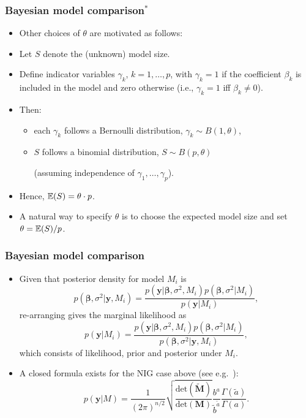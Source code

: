 \documentclass[xcolor=table,10pt]{beamer}
\begin{document}
\begin{frame}
  \frametitle{Bayesian model comparison$^\ast$}
  \begin{itemize}
  \item Other choices of $\theta$ are motivated as follows:
  \item Let $S$ denote the (unknown) model size.
  \item Define indicator variables $\gamma_k$, $k=1,\ldots, p$, with
    $\gamma_k=1$ if the coefficient $\beta_k$ is included in the model
    and zero otherwise (i.e., $\gamma_k=1$ iff $\beta_k\not=0$).
  \item Then:
    \begin{itemize}
      \addtolength{\itemsep}{2pt}
    \item each $\gamma_k$ follows a Bernoulli distribution,
      $\gamma_k\sim B(1,\theta)$,
    \item $S$ follows a binomial distribution, $S\sim B(p,\theta)$

      (assuming independence of $\gamma_1, \ldots, \gamma_p$).
    \end{itemize}
  \item Hence, ${\mathbb{E}}(S) = \theta\cdot p$.
  \item A natural way to specify $\theta$ is to choose the expected
    model size and set $\theta = {\mathbb{E}}(S) / p$.
  \end{itemize}
\end{frame}

\begin{frame}
  \frametitle{Bayesian model comparison}
  \begin{itemize}
  \item Given that posterior density for model $M_i$ is
    \begin{equation*}
      p(\bm \beta, \sigma^2|\bm y,M_i) = \frac{p(\bm y|\bm\beta,
        \sigma^2,M_i) p(\bm\beta, \sigma^2|M_i)} {p(\bm y|M_i)}, 
    \end{equation*}
    re-arranging gives the marginal likelihood as
    \begin{equation*}
      p(\bm y|M_i) = \frac{p(\bm y|\bm\beta,
        \sigma^2,M_i) p(\bm\beta, \sigma^2|M_i)} { p(\bm \beta,
        \sigma^2|\bm y,M_i)}, 
    \end{equation*}
    which consists of likelihood, prior and posterior under $M_i$.
  \item A closed formula exists for the NIG case above (see e.g.\
    \citep{Koop2003}):
    \begin{equation}
      \label{eq:1}
      p(\bm y|M) = \frac{1}{(2\pi)^{n/2}} \sqrt{\frac{\text{det}(\tilde
          {\bm M})} {\text{det}(\bm M)}} \frac{b^a}{{\tilde b}^{\tilde
          a}} \frac{\Gamma(\tilde a)} {\Gamma(a)}. 
    \end{equation}
  \end{itemize}
\end{frame}
\end{document}
